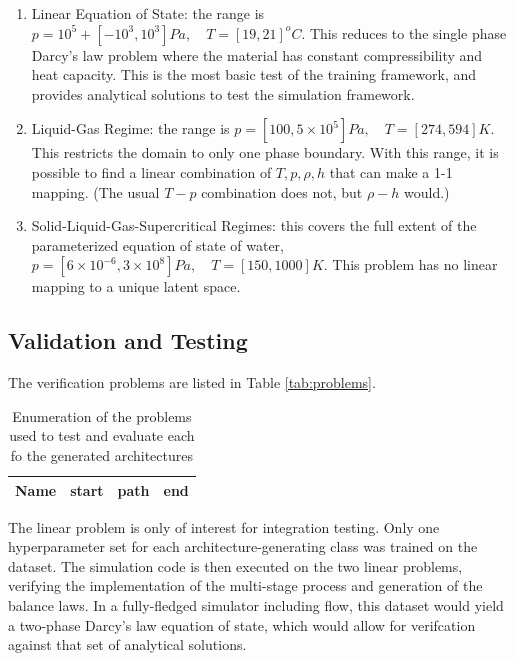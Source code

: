 \documentclass[]{article}
\begin{document}
\begin{enumerate}
\def\labelenumi{\arabic{enumi}.}
\item Linear Equation of State: the range is $ p = 10^5+[-10^3, 10^3]
  Pa,\quad T = [ 19, 21 ] ^o C$. This reduces to the single phase
  Darcy's law problem where the material has constant compressibility
  and heat capacity. This is the most basic test of the training
  framework, and provides analytical solutions to test the simulation
  framework.
\item Liquid-Gas Regime: the range is  $ p = [100,5\times 10^5] Pa,
  \quad T = [274,594] K$. This restricts the domain to only one phase
  boundary. With this range, it is possible to find a linear
  combination of $T,p,\rho,h$ that can make a 1-1 mapping. (The usual
  $T-p$ combination does not, but $\rho-h$ would.)
\item Solid-Liquid-Gas-Supercritical Regimes: this covers the full
  extent of the parameterized equation of state of water,
    $ p = [6\times 10^{-6},3\times 10^8]Pa, \quad T = [150,1000] K
    $. This problem has no linear mapping to a unique latent space.
\end{enumerate}


\hypertarget{header-n3418}{%
\subsection{Validation and Testing}\label{header-n3418}}

The verification problems are listed in Table \ref{tab:problems}.
\begin{table}
  \caption{\label{tag:problems}Enumeration of the problems used to test and evaluate each fo the generated architectures}
\begin{tabular}{l|c|c|c}
  Name & start & path & end\\
\hline
\end{tabular}
\end{table}


The linear problem is only of interest for integration testing. Only one
hyperparameter set for each architecture-generating class was trained
on the dataset. The simulation code is then executed on the two linear
problems, verifying the implementation of the multi-stage process and
generation of the balance laws. In a fully-fledged simulator including flow, this
dataset would yield a two-phase Darcy's law equation of state, which
would allow for verifcation against that set of analytical solutions.
\end{document}

